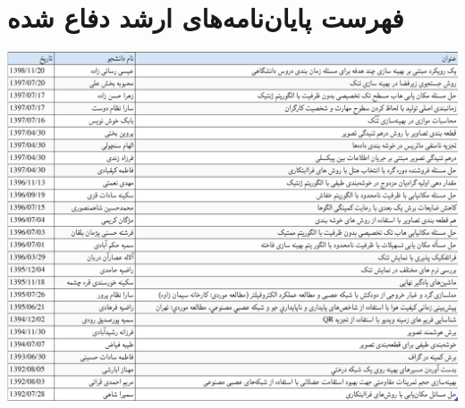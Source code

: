 \documentclass[11pt,a4paper]{bidimoderncv}
\begin{document}
%
%



\newpage
\def\refname{
{\Large تألیفات} 
 (به ترتیب نزولی سال نشر)
 }
\nocite{*}


\section{فهرست پایان‌نامه‌های ارشد دفاع شده}
\centering
\includegraphics[width=1\linewidth]{MSc-Projects.png}
\end{document}
